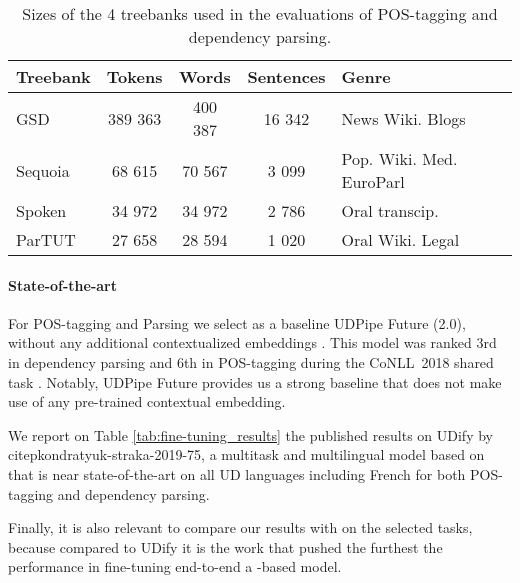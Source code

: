 \begin{table}
    \centering
    \begin{tabular}{lcccl}
        \toprule
        Treebank & Tokens  & Words   & Sentences & Genre                    \\
        \midrule
        GSD      & 389 363 & 400 387 & 16 342    & News Wiki. Blogs         \\
        Sequoia  & 68 615  & 70 567  & 3 099     & Pop. Wiki. Med. EuroParl \\
        Spoken   & 34 972  & 34 972  & 2 786     & Oral transcip.           \\
        ParTUT   & 27 658  & 28 594  & 1 020     & Oral Wiki. Legal         \\
        \bottomrule
    \end{tabular}
    \caption{Sizes of the 4 treebanks used in the evaluations of POS-tagging and dependency parsing. \label{treebanks-tab-cabernet}}
\end{table}

\paragraph{State-of-the-art}

For POS-tagging and Parsing we select as a baseline UDPipe Future (2.0), without any additional contextualized embeddings \citep{straka-2018-udpipe}. This model was ranked 3rd in dependency parsing and 6th in POS-tagging during the CoNLL~2018 shared task \citep{seker-etal-2018-universal}. Notably, UDPipe Future provides us a strong baseline that does not make use of any pre-trained contextual embedding.

We report on Table \ref{tab:fine-tuning_results} the published results on UDify by \\citep{kondratyuk-straka-2019-75}, a multitask and multilingual model based on \mbert that is near state-of-the-art on all UD languages including French for both POS-tagging and dependency parsing.



Finally, it is also relevant to compare our results with \camembert on the selected tasks, because compared to UDify it is the work that pushed the furthest the performance in fine-tuning end-to-end a \bert-based model.

